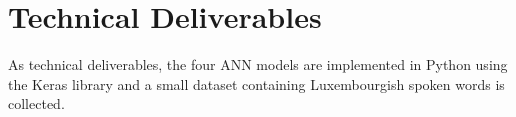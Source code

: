 \section{Technical Deliverables} 

As technical deliverables, the four ANN models are implemented in Python using
the Keras\cite{chollet2015keras} library and a small dataset containing
Luxembourgish spoken words is collected.
